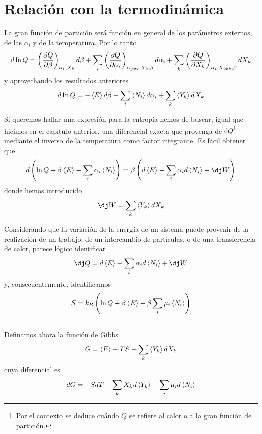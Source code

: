 \section{Relación con la termodinámica}

La gran función de partición será función en general de los parámetros externos, de las $\alpha_i$ y de la temperatura.
Por lo tanto
$$d\ln Q = \left( \pdv{Q}{\beta} \right)_{\alpha_i, X_k} d\beta + \sum_i \left( \pdv{Q}{\alpha_i} \right)_{\alpha_{j\neq i}, X_k, \beta} d\alpha_i + \sum_k \left(  \pdv{Q}{X_k} \right)_{\alpha_i, X_{i \neq k}, \beta} dX_k$$
y aprovechando los resultados anteriores
\begin{equation}
	d\ln Q = -\expval{E} d\beta + \sum_i \expval{N_i} d\alpha_i + \sum_k \expval{Y_k} dX_k
\end{equation}

Si queremos hallar una expresión para la entropía hemos de buscar, igual que hicimos en el capítulo anterior, una diferencial exacta que provenga de $đQ$\footnote{Por el contexto se deduce cuándo $Q$ se refiere al calor o a la gran función de partición.} mediante el inverso de la temperatura como factor integrante.
Es fácil obtener que
\begin{equation}
	d\left( \ln Q  + \beta \expval{E} -\sum_i \alpha_i \expval{N_i} \right) = \beta \left( d\expval{E} - \sum_i \alpha_i  d\expval{N_i} + đW \right)
\end{equation}
donde hemos introducido
$$đW = \sum_k \expval{Y_k} dX_k$$

Considerando que la variación de la energía de un sistema puede provenir de la realización de un trabajo, de un intercambio de partículas, o de una transferencia de calor, parece lógico identificar
$$đQ = d\expval{E} - \sum_i \alpha_i  d\expval{N_i} + đW$$
y, consecuentemente, identificamos
\begin{equation}\label{eq:S_T3}
	S = k_B \left( \ln Q  + \beta \expval{E} -\beta \sum_i \mu_i \expval{N_i} \right)
\end{equation}

\begin{center}
	\rule[0.5ex]{5em}{0.55pt}
\end{center}

Definamos ahora la función de Gibbs
\begin{equation}
	G = \expval{E} - TS + \sum_k \expval{Y_k} dX_k \label{eq:Gibb}
\end{equation}
cuya diferencial es
\begin{equation}
	dG = -SdT + \sum_k X_k d\expval{Y_k} + \sum_i \mu_i d\expval{N_i}
\end{equation}

